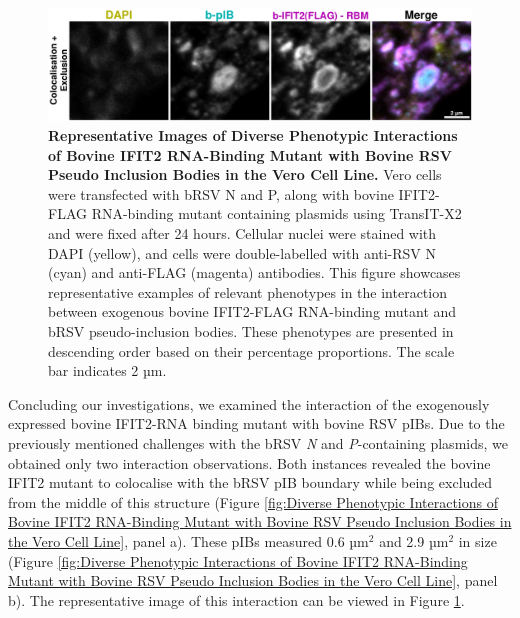 \begin{figure}
    \centering
    \includegraphics[width=1\linewidth]{09. Chapter 4/Figs/01. pIB/03. IFIT2/05. IFIT2-RNA binding mutant/02. pIB/06. bi2f24-bnbp.pdf}
    \caption[Representative Images of Diverse Phenotypic Interactions of Bovine IFIT2 RNA-Binding Mutant with Bovine RSV Pseudo Inclusion Bodies in the Vero Cell Line.]{\textbf{Representative Images of Diverse Phenotypic Interactions of Bovine IFIT2 RNA-Binding Mutant with Bovine RSV Pseudo Inclusion Bodies in the Vero Cell Line.}  Vero cells were transfected with bRSV N and P, along with bovine IFIT2-FLAG RNA-binding mutant containing plasmids using TransIT-X2 and were fixed after 24 hours. Cellular nuclei were stained with DAPI (yellow), and cells were double-labelled with anti-RSV N (cyan) and anti-FLAG (magenta) antibodies. This figure showcases representative examples of relevant phenotypes in the interaction between exogenous bovine IFIT2-FLAG RNA-binding mutant and bRSV pseudo-inclusion bodies. These phenotypes are presented in descending order based on their percentage proportions. The scale bar indicates 2 µm.}
    \label{fig:Representative Images of Diverse Phenotypic Interactions of Bovine IFIT2 RNA-Binding Mutant with Bovine RSV Pseudo Inclusion Bodies in the Vero Cell Line}
\end{figure}

Concluding our investigations, we examined the interaction of the exogenously expressed bovine IFIT2-RNA binding mutant with bovine RSV pIBs. Due to the previously mentioned challenges with the bRSV \textit{N} and \textit{P}-containing plasmids, we obtained only two interaction observations. Both instances revealed the bovine IFIT2 mutant to colocalise with the bRSV pIB boundary while being excluded from the middle of this structure (Figure \ref{fig:Diverse Phenotypic Interactions of Bovine IFIT2 RNA-Binding Mutant with Bovine RSV Pseudo Inclusion Bodies in the Vero Cell Line}, panel a). These pIBs measured 0.6 \(\mbox{µm}^2\) and 2.9 \(\mbox{µm}^2\) in size (Figure \ref{fig:Diverse Phenotypic Interactions of Bovine IFIT2 RNA-Binding Mutant with Bovine RSV Pseudo Inclusion Bodies in the Vero Cell Line}, panel b). The representative image of this interaction can be viewed in Figure \ref{fig:Representative Images of Diverse Phenotypic Interactions of Bovine IFIT2 RNA-Binding Mutant with Bovine RSV Pseudo Inclusion Bodies in the Vero Cell Line}.

